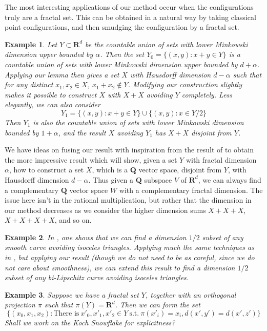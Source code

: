 \documentclass{article}
\theoremstyle{plain}
\newtheorem*{example}{Example}
\theoremstyle{plain}
\begin{document}
The most interesting applications of our method occur when the configurations truly are a fractal set. This can be obtained in a natural way by taking classical point configurations, and then smudging the configuration by a fractal set.

\begin{example}
	Let $Y \subset \mathbf{R}^d$ be the countable union of sets with lower Minkowski dimension upper bounded by $\alpha$. Then the set $Y_0 = \{ (x,y): x + y \in Y \}$ is a countable union of sets with lower Minkowski dimension upper bounded by $d + \alpha$. Applying our lemma then gives a set $X$ with Hausdorff dimension $d - \alpha$ such that for any distinct $x_1, x_2 \in X$, $x_1 + x_2 \not \in Y$. Modifying our construction slightly makes it possible to construct $X$ with $X + X$ avoiding $Y$ completely. Less elegantly, we can also consider
	\[ Y_1 = \{ (x,y) : x + y \in Y \} \cup \{ (x,y): x \in Y/2 \} \]
	Then $Y_1$ is also the countable union of sets with lower Minkowski dimension bounded by $1 + \alpha$, and the result $X$ avoiding $Y_1$ has $X + X$ disjoint from $Y$.
\end{example}

We have ideas on fusing our result with inspiration from the result of \cite{Mathe} to obtain the more impressive result which will show, given a set $Y$ with fractal dimension $\alpha$, how to construct a set $X$, which is a $\mathbf{Q}$ vector space, disjoint from $Y$, with Hausdorff dimension $d - \alpha$. Thus given a $\mathbf{Q}$ subspace $V$ of $\mathbf{R}^d$, we can always find a complementary $\mathbf{Q}$ vector space $W$ with a complementary fractal dimension. The issue here isn't in the rational multiplication, but rather that the dimension in our method decreases as we consider the higher dimension sums $X + X + X$, $X + X + X + X$, and so on.

\begin{example}
	In \cite{MalabikaRob}, one shows that we can find a dimension $1/2$ subset of any smooth curve avoiding isoceles triangles. Applying much the same techniques as in \cite{MalabikaRob}, but applying our result (though we do not need to be as careful, since we do not care about smoothness), we can extend this result to find a dimension $1/2$ subset of any {\it bi-Lipschitz} curve avoiding isoceles triangles.
\end{example}

\begin{example}
	Suppose we have a fractal set $Y$, together with an orthogonal projection $\pi$ such that $\pi(Y) = \mathbf{R}^d$. Then we can form the set
	\[ \{ (x_0,x_1,x_2): \text{There is}\ x'_0,x'_1,x'_2 \in Y\ \text{s.t.}\ \pi(x'_i) = x_i, d(x',y') = d(x',z') \} \]
	Shall we work on the Koch Snowflake for explicitness?
\end{example}
\end{document}

